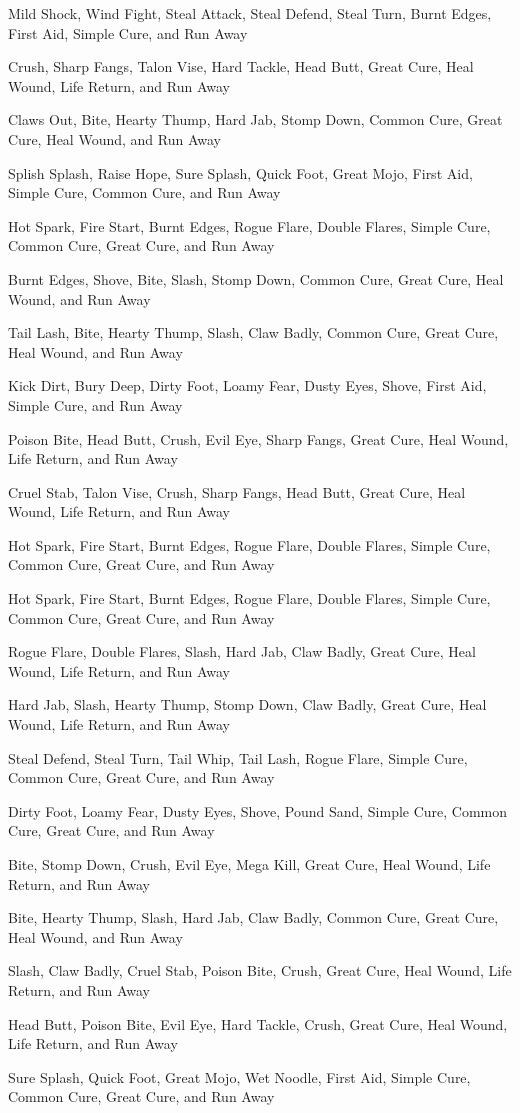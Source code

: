 \documentclass[10pt,twocolumn]{memoir}
\begin{document}
\begin{description}

\newcommand\grizzardmoves[9]{%
\item[#1]
#2, #3, #4, #5, #6, #7, #8, #9, and Run Away
}
\grizzardmoves{Airex}{Mild Shock}{Wind Fight}{Steal Attack}{Steal Defend}{Steal Turn}{Burnt Edges}{First Aid}{Simple Cure}
\grizzardmoves{Altrix}{Crush}{Sharp Fangs}{Talon Vise}{Hard Tackle}{Head Butt}{Great Cure}{Heal Wound}{Life Return}
\grizzardmoves{Ambren}{Claws Out}{Bite}{Hearty Thump}{Hard Jab}{Stomp Down}{Common Cure}{Great Cure}{Heal Wound}
\grizzardmoves{Aquax}{Splish Splash}{Raise Hope}{Sure Splash}{Quick Foot}{Great Mojo}{First Aid}{Simple Cure}{Common Cure}
\grizzardmoves{Burner}{Hot Spark}{Fire Start}{Burnt Edges}{Rogue Flare}{Double Flares}{Simple Cure}{Common Cure}{Great Cure}
\grizzardmoves{Corlyn}{Burnt Edges}{Shove}{Bite}{Slash}{Stomp Down}{Common Cure}{Great Cure}{Heal Wound}
\grizzardmoves{Cornet}{Tail Lash}{Bite}{Hearty Thump}{Slash}{Claw Badly}{Common Cure}{Great Cure}{Heal Wound}
\grizzardmoves{Dirtex}{Kick Dirt}{Bury Deep}{Dirty Foot}{Loamy Fear}{Dusty Eyes}{Shove}{First Aid}{Simple Cure}
\grizzardmoves{Dufont}{Poison Bite}{Head Butt}{Crush}{Evil Eye}{Sharp Fangs}{Great Cure}{Heal Wound}{Life Return}
\grizzardmoves{Ectrix}{Cruel Stab}{Talon Vise}{Crush}{Sharp Fangs}{Head Butt}{Great Cure}{Heal Wound}{Life Return}
\grizzardmoves{Firend}{Hot Spark}{Fire Start}{Burnt Edges}{Rogue Flare}{Double Flares}{Simple Cure}{Common Cure}{Great Cure}
\grizzardmoves{Flamex}{Hot Spark}{Fire Start}{Burnt Edges}{Rogue Flare}{Double Flares}{Simple Cure}{Common Cure}{Great Cure}
\grizzardmoves{Flarex}{Rogue Flare}{Double Flares}{Slash}{Hard Jab}{Claw Badly}{Great Cure}{Heal Wound}{Life Return}
\grizzardmoves{Flitex}{Hard Jab}{Slash}{Hearty Thump}{Stomp Down}{Claw Badly}{Great Cure}{Heal Wound}{Life Return}
\grizzardmoves{Flyer}{Steal Defend}{Steal Turn}{Tail Whip}{Tail Lash}{Rogue Flare}{Simple Cure}{Common Cure}{Great Cure}
\grizzardmoves{Lander}{Dirty Foot}{Loamy Fear}{Dusty Eyes}{Shove}{Pound Sand}{Simple Cure}{Common Cure}{Great Cure}
\grizzardmoves{Megax}{Bite}{Stomp Down}{Crush}{Evil Eye}{Mega Kill}{Great Cure}{Heal Wound}{Life Return}
\grizzardmoves{Noctis}{Bite}{Hearty Thump}{Slash}{Hard Jab}{Claw Badly}{Common Cure}{Great Cure}{Heal Wound}
\grizzardmoves{Oceax}{Slash}{Claw Badly}{Cruel Stab}{Poison Bite}{Crush}{Great Cure}{Heal Wound}{Life Return}
\grizzardmoves{Ortrix}{Head Butt}{Poison Bite}{Evil Eye}{Hard Tackle}{Crush}{Great Cure}{Heal Wound}{Life Return}
\grizzardmoves{Sailor}{Sure Splash}{Quick Foot}{Great Mojo}{Wet Noodle}{First Aid}{Simple Cure}{Common Cure}{Great Cure}

\end{description}
\end{document}
